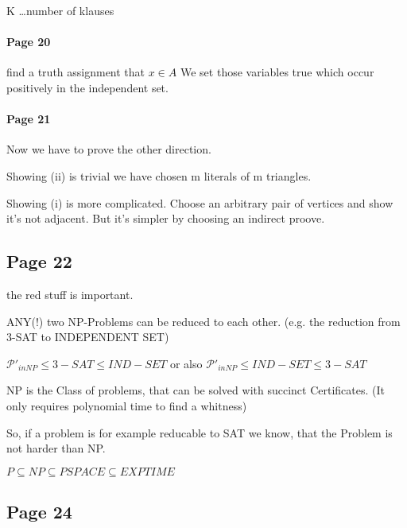 \documentclass[a4paper]{article}
\begin{document}
K \ldots number of klauses

\paragraph{Page 20} find a truth assignment that $x \in A$
We set those variables true which occur positively in the independent set.



\paragraph{Page 21} Now we have to prove the other direction.

Showing (ii) is trivial we have chosen m literals of m triangles.

Showing (i) is more complicated. Choose an arbitrary pair of vertices and show
it's not adjacent. But it's simpler by choosing an indirect proove.





\subsection{Page 22}

the red stuff is important.

ANY(!) two NP-Problems can be reduced to each other. (e.g. the reduction from
3-SAT to INDEPENDENT SET) 

$ \mathcal{P}'_{in NP} \leq 3-SAT \leq IND-SET$ or also $ \mathcal{P}'_{in NP}
\leq IND-SET \leq 3-SAT$

NP is the Class of problems, that can be solved with succinct Certificates. (It
only requires polynomial time to find a whitness)

So, if a problem is for example reducable to SAT we know, that the Problem is
not harder than NP.

$P \subseteq NP \subseteq PSPACE \subseteq EXPTIME$


\subsection{Page 24}

 \begin{center}
\end{center} 
\end{document}
